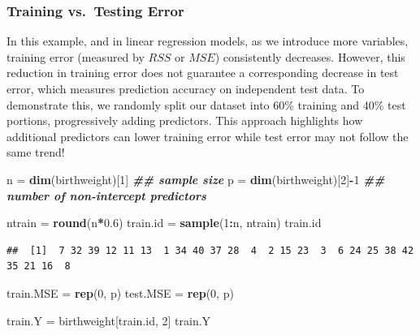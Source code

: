 \documentclass[
]{book}
\newenvironment{Shaded}{\begin{snugshade}}{\end{snugshade}}
\newcommand{\DecValTok}[1]{\textcolor[rgb]{0.00,0.00,0.81}{#1}}
\newcommand{\DocumentationTok}[1]{\textcolor[rgb]{0.56,0.35,0.01}{\textbf{\textit{#1}}}}
\newcommand{\FloatTok}[1]{\textcolor[rgb]{0.00,0.00,0.81}{#1}}
\newcommand{\FunctionTok}[1]{\textcolor[rgb]{0.13,0.29,0.53}{\textbf{#1}}}
\newcommand{\NormalTok}[1]{#1}
\newcommand{\OtherTok}[1]{\textcolor[rgb]{0.56,0.35,0.01}{#1}}
\newcommand{\SpecialCharTok}[1]{\textcolor[rgb]{0.81,0.36,0.00}{\textbf{#1}}}
\begin{document}
\subsubsection{Training vs.~Testing Error}\label{training-vs.-testing-error}

In this example, and in linear regression models, as we introduce more variables, training error (measured by \(RSS\) or \(MSE\)) consistently decreases. However, this reduction in training error does not guarantee a corresponding decrease in test error, which measures prediction accuracy on independent test data. To demonstrate this, we randomly split our dataset into 60\% training and 40\% test portions, progressively adding predictors. This approach highlights how additional predictors can lower training error while test error may not follow the same trend!

\begin{Shaded}
\begin{Highlighting}[]
\NormalTok{n }\OtherTok{=} \FunctionTok{dim}\NormalTok{(birthweight)[}\DecValTok{1}\NormalTok{]     }\DocumentationTok{\#\# sample size}
\NormalTok{p }\OtherTok{=} \FunctionTok{dim}\NormalTok{(birthweight)[}\DecValTok{2}\NormalTok{]}\SpecialCharTok{{-}}\DecValTok{1}   \DocumentationTok{\#\# number of non{-}intercept predictors}

\NormalTok{ntrain }\OtherTok{=}  \FunctionTok{round}\NormalTok{(n}\SpecialCharTok{*}\FloatTok{0.6}\NormalTok{)}
\NormalTok{train.id }\OtherTok{=} \FunctionTok{sample}\NormalTok{(}\DecValTok{1}\SpecialCharTok{:}\NormalTok{n, ntrain)}
\NormalTok{train.id}
\end{Highlighting}
\end{Shaded}

\begin{verbatim}
##  [1]  7 32 39 12 11 13  1 34 40 37 28  4  2 15 23  3  6 24 25 38 42 35 21 16  8
\end{verbatim}

\begin{Shaded}
\begin{Highlighting}[]
\NormalTok{train.MSE }\OtherTok{=} \FunctionTok{rep}\NormalTok{(}\DecValTok{0}\NormalTok{, p)}
\NormalTok{test.MSE }\OtherTok{=} \FunctionTok{rep}\NormalTok{(}\DecValTok{0}\NormalTok{, p)}

\NormalTok{train.Y }\OtherTok{=}\NormalTok{ birthweight[train.id, }\DecValTok{2}\NormalTok{]}
\NormalTok{train.Y}
\end{Highlighting}
\end{Shaded}
\end{document}
